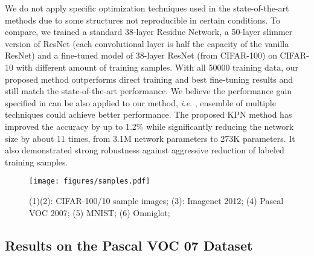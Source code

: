 \documentclass[journal]{IEEEtran}
\newcommand{\ie}{\textit{i}.\textit{e}. }
\begin{document}
We do not apply specific optimization techniques used in the state-of-the-art methods due to some structures not reproducible in certain conditions. To compare, we trained a standard 38-layer Residue Network, a 50-layer slimmer version of ResNet (each convolutional layer is half the capacity of the vanilla ResNet) and a fine-tuned model of 38-layer ResNet (from CIFAR-100) on CIFAR-10 with different amount of training samples.  With all 50000 training data, our proposed method outperforms direct training and best fine-tuning results and still match the state-of-the-art performance. 
We believe the performance gain specified in \cite{lee2016generalizing, mishkin2015all} can be also applied to our method, \ie, ensemble of multiple techniques could achieve better performance. The proposed KPN method has improved the accuracy by up to 1.2\% while significantly reducing the network size by about 11 times, from 3.1M network parameters to 273K parameters. It also demonstrated strong robustness against aggressive reduction of labeled training samples.

\begin{figure}[h]
\begin{center}
\texttt{[image: figures/samples.pdf]}
\end{center}
\caption{(1)(2): CIFAR-100/10 sample images; (3): Imagenet 2012; (4) Pascal VOC 2007; (5) MNIST; (6) Omniglot;}
\label{fig:samples}
\end{figure}

\subsection{Results on the Pascal VOC 07 Dataset}
\end{document}

